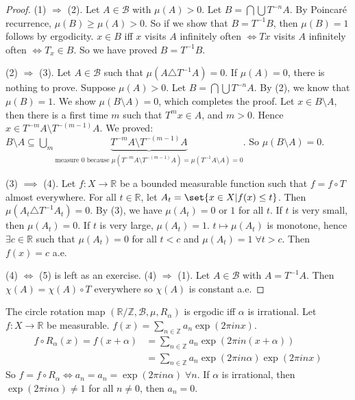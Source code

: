 \documentclass{article}
\begin{document}
\begin{proof}
  (1) $\Rightarrow$ (2). Let $A \in \mathcal{B}$ with $\mu(A) > 0$. Let $B = \bigcap \bigcup T^{-n}A$.
  By Poincar\'e recurrence, $\mu(B) \geq \mu(A) > 0$. So if we show that $B = T^{-1} B$, then $\mu(B) = 1$ follows by ergodicity.
  $x \in B$ iff $x$ visits $A$ infinitely often $\iff Tx$ visits $A$ infinitely often $\iff T_x \in B$.
  So we have proved $B = T^{-1} B$.

  (2) $\Rightarrow$ (3). Let $A \in \mathcal{B}$ such that $\mu(A \triangle T^{-1} A) = 0$. If $\mu(A) = 0$, there is nothing to prove. Suppose $\mu(A) > 0$.
  Let $B = \bigcap \bigcup T^{-n} A$. By (2), we know that $\mu(B) = 1$. We show $\mu(B \setminus A) = 0$, which completes the proof.
  Let $x \in B \setminus A$, then there is a first time $m$ such that $T^m x \in A$, and $m > 0$.
  Hence $x \in T^{-m} A \setminus T^{-(m-1)}A$. We proved: $B \setminus A \subseteq \bigcup_m \underbrace{T^{-m} A \setminus T^{-(m-1)} A}_{\text{measure 0 because } \mu(T^{-m} A \setminus T^{-(m-1)} A) = \mu(T^{-1} A \setminus A) = 0}$.
  So $\mu(B \setminus A) = 0$.

  (3) $\implies$ (4).
  Let $f : X \to \mathbb{R}$ be a bounded measurable function such that $f = f \circ T$ almost everywhere.
  For all $t \in \mathbb{R}$, let $A_t = \set{x \in X | f(x) \leq t}$.
  Then $\mu(A_t \triangle T^{-1} A_t) = 0$.
  By (3), we have $\mu(A_t) = 0$ or $1$ for all $t$.
  If $t$ is very small, then $\mu(A_t) = 0$. If $t$ is very large, $\mu(A_t) = 1$. $t \mapsto \mu(A_t)$ is monotone, hence $\exists c \in \mathbb{R}$ such that $\mu(A_t) = 0$ for all $t < c$ and $\mu(A_t) = 1 \; \forall t > c$.
  Then $f(x) = c$ a.e.

  (4) $\Leftrightarrow$ (5) is left as an exercise.
  (4) $\Rightarrow$ (1). Let $A \in \mathcal{B}$ with $A = T^{-1} A$. Then $\chi(A) = \chi(A) \circ T$ everywhere so $\chi(A)$ is constant a.e.
\end{proof}
\begin{eg}
  The circle rotation map $(\mathbb{R}/\mathbb{Z}, \mathcal{B}, \mu, R_\alpha)$ is ergodic iff $\alpha$ is irrational.
  Let $f: X \to \mathbb{R}$ be measurable. $f(x) = \sum_{n \in \mathbb{Z}} a_n \exp(2\pi i n x)$.
  \begin{align}
    f \circ R_\alpha(x) = f(x + \alpha) &= \sum_{n \in \mathbb{Z}} a_n \exp(2 \pi i n (x + \alpha)) \\
                                        &= \sum_{n \in \mathbb{Z}} a_n \exp(2\pi i n \alpha) \exp(2 \pi i n x)
  \end{align}
  So $f = f \circ R_\alpha \iff a_n = a_n = \exp(2 \pi i n \alpha) \; \forall n$. If $\alpha$ is irrational, then $\exp(2 \pi i n \alpha) \neq 1$ for all $n \neq 0$, then $a_n = 0$.
\end{eg}
\printindex
\end{document}
